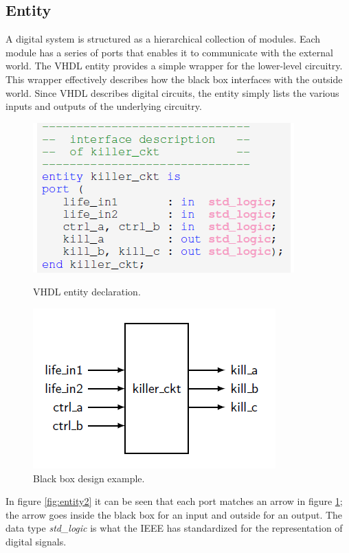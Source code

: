 \subsection{Entity}
\noindent A digital system is structured as a hierarchical collection of modules. Each module has a series of ports that enables it to communicate with the external world. The VHDL entity provides a simple wrapper for the lower-level circuitry.
This wrapper effectively describes how the black box interfaces with the outside world. Since VHDL describes digital circuits, the entity simply lists the various inputs and outputs of the underlying circuitry.
\begin{figure}
	\centering
	\begin{minipage}{.5\textwidth}
		\centering
		\includegraphics[width=.7\linewidth]{IMG/ch3/ENTITY2}
		\caption{VHDL entity declaration.}
		\label{fig:entity2}
	\end{minipage}%
	\begin{minipage}{.5\textwidth}
		\centering
		\includegraphics[width=.62\linewidth]{IMG/ch3/ENTITY1}
		\caption{Black box design example.}
		\label{fig:entity1}
	\end{minipage}
\end{figure}
\noindent In figure \ref{fig:entity2} it can be seen that each port matches an arrow in figure \ref{fig:entity1}; the arrow goes inside the black box for an input and outside for an output. The data type \textit{std\_logic} is what the IEEE has standardized for the representation of digital signals. 

